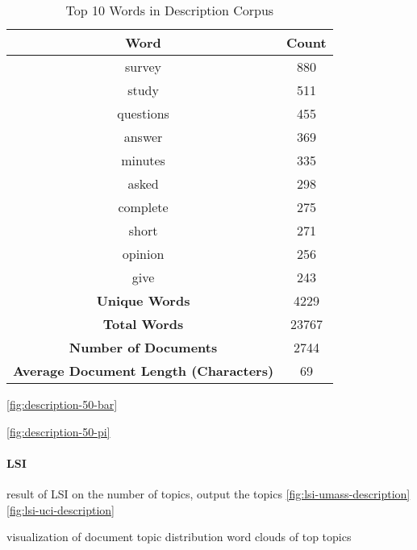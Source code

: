 \documentclass[letterpaper,12pt]{article}
\begin{document}
\begin{table}
	\caption{\label{tab:description_top_words} Top 10 Words in Description Corpus}
	\begin{center}
		\begin{tabular}{|c|c|}
			\hline
			\textbf{Word} & \textbf{Count} \\
			\hline
			survey & 880 \\
			\hline
			study & 511 \\
			\hline
			questions & 455 \\
			\hline
			answer & 369 \\
			\hline
			minutes & 335 \\
			\hline
			asked & 298 \\
			\hline
			complete & 275 \\
			\hline
			short & 271 \\
			\hline
			opinion & 256 \\
			\hline
			give & 243 \\
			\hline
			\textbf{Unique Words} & 4229 \\
			\hline
			\textbf{Total Words} & 23767 \\
			\hline
			\textbf{Number of Documents} & 2744 \\
			\hline
			\textbf{Average Document Length (Characters)} & 69 \\
			\hline
		\end{tabular}
	\end{center}
\end{table}

\ref{fig:description-50-bar}

\ref{fig:description-50-pi}

\newpage
\paragraph{LSI}
result of LSI on the number of topics, output the topics
\ref{fig:lsi-umass-description}
\ref{fig:lsi-uci-description}


\newpage
visualization of document topic distribution
word clouds of top topics
\end{document}
